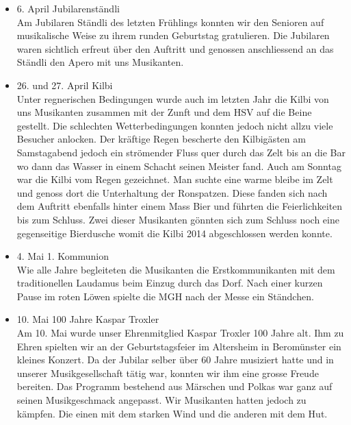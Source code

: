 \begin{history}
\begin{itemize}
            \item 6. April Jubilarenständli\\
                  Am Jubilaren Ständli des letzten Frühlings konnten wir den Senioren auf
                  musikalische Weise zu ihrem runden Geburtstag gratulieren. Die Jubilaren
                  waren sichtlich erfreut über den Auftritt und genossen anschliessend an
                  das Ständli den Apero mit uns Musikanten.

            \item 26. und 27. April Kilbi\\
                  Unter regnerischen Bedingungen wurde auch im letzten Jahr die Kilbi von
                  uns Musikanten zusammen mit der Zunft und dem HSV auf die Beine
                  gestellt. Die schlechten Wetterbedingungen konnten jedoch nicht allzu
                  viele Besucher anlocken.  Der kräftige Regen bescherte den Kilbigästen
                  am Samstagabend jedoch ein strömender Fluss quer durch das Zelt bis an
                  die Bar  wo dann das Wasser in einem Schacht seinen Meister fand. Auch
                  am Sonntag war die Kilbi vom Regen gezeichnet. Man suchte eine warme
                  bleibe im Zelt und genoss dort die Unterhaltung der Ronspatzen. Diese
                  fanden sich nach dem Auftritt ebenfalls hinter einem Mass Bier  und
                  führten die Feierlichkeiten bis zum Schluss. Zwei dieser Musikanten
                  gönnten sich zum Schluss noch eine gegenseitige Bierdusche womit die
                  Kilbi 2014 abgeschlossen werden konnte.

            \item 4. Mai 1. Kommunion\\
                  Wie alle Jahre begleiteten die Musikanten die Erstkommunikanten mit dem
                  traditionellen Laudamus beim Einzug durch das Dorf. Nach einer kurzen
                  Pause im roten Löwen spielte die MGH nach der Messe ein Ständchen.

            \item 10. Mai 100 Jahre Kaspar Troxler\\
                  Am 10. Mai wurde unser Ehrenmitglied Kaspar Troxler 100 Jahre alt. Ihm
                  zu Ehren spielten wir an der Geburtstagsfeier im Altersheim in
                  Beromünster ein kleines Konzert. Da der Jubilar selber über 60 Jahre
                  musiziert hatte und in unserer Musikgesellschaft tätig war, konnten wir
                  ihm eine grosse Freude bereiten. Das Programm bestehend aus Märschen und
                  Polkas war ganz auf seinen Musikgeschmack angepasst. Wir Musikanten
                  hatten jedoch zu kämpfen. Die einen mit dem starken Wind und die anderen
                  mit dem Hut.


\end{itemize}
\end{history}
